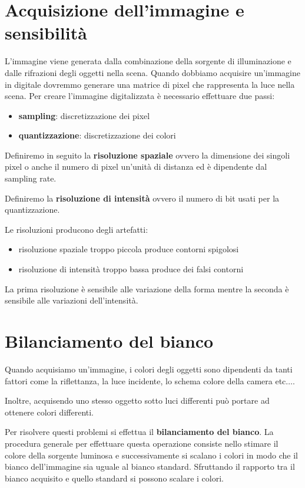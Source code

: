 \section{Acquisizione dell'immagine e sensibilità}
L'immagine viene generata dalla combinazione della sorgente di illuminazione e
dalle rifrazioni degli oggetti nella scena. Quando dobbiamo acquisire un'immagine
in digitale dovremmo generare una matrice di pixel che rappresenta la luce nella
scena. Per creare l'immagine digitalizzata è necessario effettuare due passi:
\begin{itemize}
    \item \textbf{sampling}: discretizzazione dei pixel
    \item \textbf{quantizzazione}: discretizzazione dei colori
\end{itemize}

Definiremo in seguito la \textbf{risoluzione spaziale} ovvero la dimensione dei
singoli pixel o anche il numero di pixel un'unità di distanza ed è dipendente dal
sampling rate.

Definiremo la \textbf{risoluzione di intensità} ovvero il numero di bit usati per
la quantizzazione.

Le risoluzioni producono degli artefatti:
\begin{itemize}
    \item risoluzione spaziale troppo piccola produce contorni spigolosi
    \item risoluzione di intensità troppo bassa produce dei falsi contorni
\end{itemize}

La prima risoluzione è sensibile alle variazione della forma mentre la seconda è
sensibile alle variazioni dell'intensità.

\section{Bilanciamento del bianco}
Quando acquisiamo un'immagine, i colori degli oggetti sono dipendenti da tanti
fattori come la riflettanza, la luce incidente, lo schema colore della camera
etc$\dots$.

Inoltre, acquisendo uno stesso oggetto sotto luci differenti può portare ad
ottenere colori differenti.

Per risolvere questi problemi si  effettua il \textbf{bilanciamento del bianco}.
La procedura generale per effettuare questa operazione consiste nello stimare il
colore della sorgente luminosa e successivamente si scalano i colori in modo che
il bianco dell'immagine sia uguale al bianco standard. Sfruttando il rapporto
tra il bianco acquisito e quello standard si possono scalare i colori.

